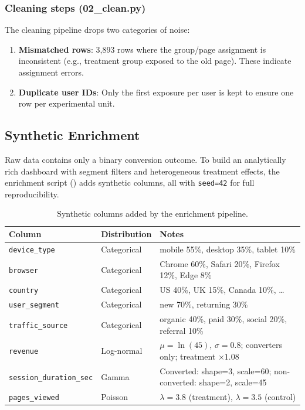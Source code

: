 \subsubsection{Cleaning steps (02\_clean.py)}

The cleaning pipeline drops two categories of noise:
\begin{enumerate}
  \item \textbf{Mismatched rows}: 3,893 rows where the group/page assignment
    is inconsistent (e.g., treatment group exposed to the old page). These
    indicate assignment errors.
  \item \textbf{Duplicate user IDs}: Only the first exposure per user is kept
    to ensure one row per experimental unit.
\end{enumerate}

\subsection{Synthetic Enrichment}

Raw data contains only a binary conversion outcome. To build an analytically
rich dashboard with segment filters and heterogeneous treatment effects, the
enrichment script () adds synthetic
columns, all with \texttt{seed=42} for full reproducibility.

\begin{table}[h]
  \centering
  \small
  \begin{tabular}{lll}
    \toprule
    Column & Distribution & Notes \\
    \midrule
    \texttt{device\_type} & Categorical & mobile 55\%, desktop 35\%, tablet 10\% \\
    \texttt{browser} & Categorical & Chrome 60\%, Safari 20\%, Firefox 12\%, Edge 8\% \\
    \texttt{country} & Categorical & US 40\%, UK 15\%, Canada 10\%, \ldots \\
    \texttt{user\_segment} & Categorical & new 70\%, returning 30\% \\
    \texttt{traffic\_source} & Categorical & organic 40\%, paid 30\%, social 20\%, referral 10\% \\
    \texttt{revenue} & Log-normal & $\mu=\ln(45)$, $\sigma=0.8$; converters only; treatment $\times 1.08$ \\
    \texttt{session\_duration\_sec} & Gamma & Converted: shape=3, scale=60; non-converted: shape=2, scale=45 \\
    \texttt{pages\_viewed} & Poisson & $\lambda=3.8$ (treatment), $\lambda=3.5$ (control) \\
    \bottomrule
  \end{tabular}
  \caption{Synthetic columns added by the enrichment pipeline.}
  \label{tab:abtest-enrichment}
\end{table}

